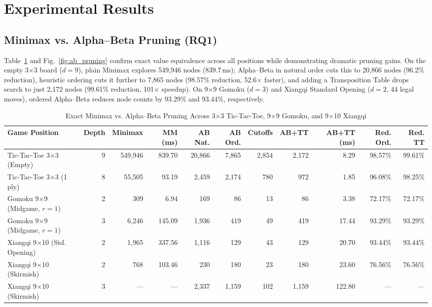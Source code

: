 \documentclass[conference]{IEEEtran}
\begin{document}
\section{Experimental Results}
\subsection{Minimax vs. Alpha--Beta Pruning (RQ1)}
Table~\ref{tab:minimax_ab} and Fig.~\ref{fig:ab_pruning} confirm exact value equivalence across all positions while demonstrating dramatic pruning gains. On the empty 3$\times$3 board ($d=9$), plain Minimax explores 549,946 nodes (839.7\,ms); Alpha--Beta in natural order cuts this to 20,866 nodes (96.2\% reduction), heuristic ordering cuts it further to 7,865 nodes (98.57\% reduction, 52.6$\times$ faster), and adding a Transposition Table drops search to just 2,172 nodes (99.61\% reduction, 101$\times$ speedup). On 9$\times$9 Gomoku ($d=3$) and Xiangqi Standard Opening ($d=2$, 44 legal moves), ordered Alpha--Beta reduces node counts by 93.29\% and 93.44\%, respectively.

\begin{table}[t]
\centering
\caption{Exact Minimax vs. Alpha--Beta Pruning Across 3$\times$3 Tic-Tac-Toe, 9$\times$9 Gomoku, and 9$\times$10 Xiangqi}
\label{tab:minimax_ab}
\begin{tabular}{@{}lrrrrrrrrrr@{}}
\toprule
\textbf{Game Position} & \textbf{Depth} & \textbf{Minimax} & \textbf{MM (ms)} & \textbf{AB Nat.} & \textbf{AB Ord.} & \textbf{Cutoffs} & \textbf{AB+TT} & \textbf{AB+TT (ms)} & \textbf{Red. Ord.} & \textbf{Red. TT} \\
\midrule
Tic-Tac-Toe 3$\times$3 (Empty) & 9 & 549,946 & 839.70 & 20,866 & 7,865 & 2,854 & 2,172 & 8.29 & 98.57\% & 99.61\% \\
Tic-Tac-Toe 3$\times$3 (1 ply) & 8 & 55,505 & 93.19 & 2,459 & 2,174 & 780 & 972 & 1.85 & 96.08\% & 98.25\% \\
Gomoku 9$\times$9 (Midgame, $r{=}1$) & 2 & 309 & 6.94 & 169 & 86 & 13 & 86 & 3.38 & 72.17\% & 72.17\% \\
Gomoku 9$\times$9 (Midgame, $r{=}1$) & 3 & 6,246 & 145.09 & 1,936 & 419 & 49 & 419 & 17.44 & 93.29\% & 93.29\% \\
Xiangqi 9$\times$10 (Std. Opening) & 2 & 1,965 & 337.56 & 1,116 & 129 & 43 & 129 & 20.70 & 93.44\% & 93.44\% \\
Xiangqi 9$\times$10 (Skirmish) & 2 & 768 & 103.46 & 230 & 180 & 23 & 180 & 23.60 & 76.56\% & 76.56\% \\
Xiangqi 9$\times$10 (Skirmish) & 3 & --- & --- & 2,337 & 1,159 & 102 & 1,159 & 122.80 & --- & --- \\
\bottomrule
\end{tabular}
\end{table}
\end{document}
